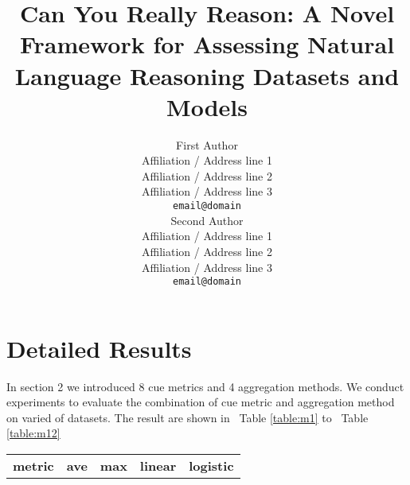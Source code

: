 \documentclass[11pt]{article}
\title{Can You Really Reason: A Novel Framework for Assessing Natural Language Reasoning Datasets and Models}
\author{First Author \\
  Affiliation / Address line 1 \\
  Affiliation / Address line 2 \\
  Affiliation / Address line 3 \\
  \texttt{email@domain} \\\And
  Second Author \\
  Affiliation / Address line 1 \\
  Affiliation / Address line 2 \\
  Affiliation / Address line 3 \\
  \texttt{email@domain} \\}
\date{}
\newcommand{\tabref}[1]{Table \ref{#1}}
\begin{document}

\appendix
\section{Detailed Results}
\label{sec:appendix}
In section 2 we introduced 8 cue metrics and 4 aggregation methods. We conduct experiments to
evaluate the combination of cue metric and aggregation method on varied of datasets. 
The result are shown in ~\tabref{table:m1} to ~\tabref{table:m12}

\begin{table}[htbp]
\begin{tabular}{lllllllll}
\hline
\multicolumn{1}{c}{\multirow{2}{*}{\textbf{metric}}} & \multicolumn{2}{c}{\textbf{ave}}                                                                                                                                   & \multicolumn{2}{c}{\textbf{max}}                                                                                                                                  & \multicolumn{2}{c}{\textbf{linear}}                                                                                                                                & \multicolumn{2}{c}{\textbf{logistic}}                                                                                                                              \\ \cline{2-9} 

\end{tabular}
\end{table}
\end{document}
